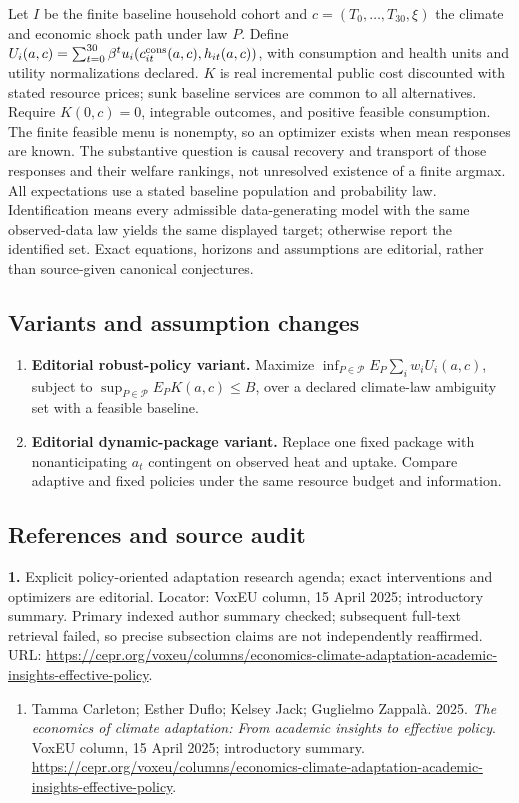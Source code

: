 \documentclass[11pt,a4paper]{article}
\begin{document}
Let \(I\) be the finite baseline household cohort and \(c=(T_0,\ldots,T_{30},\xi)\) the climate and economic shock path under law \(P\). Define \(U_i(a,c)=\sum_{t=0}^{30}\beta^tu_i(c_{it}^{\rm cons}(a,c),h_{it}(a,c))\), with consumption and health units and utility normalizations declared. \(K\) is real incremental public cost discounted with stated resource prices; sunk baseline services are common to all alternatives. Require \(K(0,c)=0\), integrable outcomes, and positive feasible consumption. The finite feasible menu is nonempty, so an optimizer exists when mean responses are known. The substantive question is causal recovery and transport of those responses and their welfare rankings, not unresolved existence of a finite argmax. All expectations use a stated baseline population and probability law. Identification means every admissible data-generating model with the same observed-data law yields the same displayed target; otherwise report the identified set. Exact equations, horizons and assumptions are editorial, rather than source-given canonical conjectures.
\subsection*{Variants and assumption changes}
\begin{enumerate}
\item \textbf{Editorial robust-policy variant.} Maximize \(\inf_{P\in\mathcal P}E_P\sum_iw_iU_i(a,c)\), subject to \(\sup_{P\in\mathcal P}E_PK(a,c)\leq B\), over a declared climate-law ambiguity set with a feasible baseline.
\item \textbf{Editorial dynamic-package variant.} Replace one fixed package with nonanticipating \(a_t\) contingent on observed heat and uptake. Compare adaptive and fixed policies under the same resource budget and information.
\end{enumerate}
\subsection*{References and source audit}
\textbf{1.} Explicit policy-oriented adaptation research agenda; exact interventions and optimizers are editorial. Locator: VoxEU column, 15 April 2025; introductory summary. Primary indexed author summary checked; subsequent full-text retrieval failed, so precise subsection claims are not independently reaffirmed. URL: \url{https://cepr.org/voxeu/columns/economics-climate-adaptation-academic-insights-effective-policy}.
\begin{enumerate}\raggedright
\item\hypertarget{definitions:source:30007715:1}{} Tamma Carleton; Esther Duflo; Kelsey Jack; Guglielmo Zappalà. 2025. \emph{The economics of climate adaptation: From academic insights to effective policy}. VoxEU column, 15 April 2025; introductory summary.
\url{https://cepr.org/voxeu/columns/economics-climate-adaptation-academic-insights-effective-policy}.
\end{enumerate}
\end{document}
